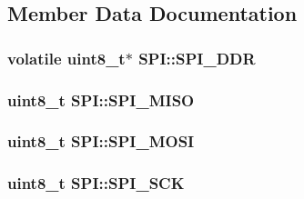 \subsection{Member Data Documentation}
\subsubsection[{\texorpdfstring{S\+P\+I\+\_\+\+D\+DR}{SPI_DDR}}]{\setlength{\rightskip}{0pt plus 5cm}volatile uint8\+\_\+t$\ast$ S\+P\+I\+::\+S\+P\+I\+\_\+\+D\+DR\hspace{0.3cm}{\ttfamily [private]}}\hypertarget{classSPI_a5dca744360bf2b10d74ab512f2fb71ea}{}\label{classSPI_a5dca744360bf2b10d74ab512f2fb71ea}
\subsubsection[{\texorpdfstring{S\+P\+I\+\_\+\+M\+I\+SO}{SPI_MISO}}]{\setlength{\rightskip}{0pt plus 5cm}uint8\+\_\+t S\+P\+I\+::\+S\+P\+I\+\_\+\+M\+I\+SO\hspace{0.3cm}{\ttfamily [private]}}\hypertarget{classSPI_a6fefdb147a2789fe10efb13f8100235c}{}\label{classSPI_a6fefdb147a2789fe10efb13f8100235c}
\subsubsection[{\texorpdfstring{S\+P\+I\+\_\+\+M\+O\+SI}{SPI_MOSI}}]{\setlength{\rightskip}{0pt plus 5cm}uint8\+\_\+t S\+P\+I\+::\+S\+P\+I\+\_\+\+M\+O\+SI\hspace{0.3cm}{\ttfamily [private]}}\hypertarget{classSPI_a10159404dbabef20333fe73f69a3fca6}{}\label{classSPI_a10159404dbabef20333fe73f69a3fca6}
\subsubsection[{\texorpdfstring{S\+P\+I\+\_\+\+S\+CK}{SPI_SCK}}]{\setlength{\rightskip}{0pt plus 5cm}uint8\+\_\+t S\+P\+I\+::\+S\+P\+I\+\_\+\+S\+CK\hspace{0.3cm}{\ttfamily [private]}}\hypertarget{classSPI_ad9ff914a9831b004b1f8fa5368558e01}{}\label{classSPI_ad9ff914a9831b004b1f8fa5368558e01}
